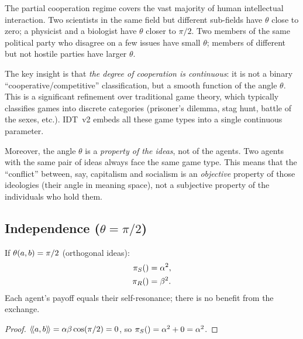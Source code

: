 \begin{interpretation}
\label{interp:cooperation-spectrum}
The partial cooperation regime covers the vast majority of human intellectual
interaction. Two scientists in the same field but different sub-fields have
$\theta$ close to zero; a physicist and a biologist have $\theta$ closer to
$\pi/2$. Two members of the same political party who disagree on a few issues
have small $\theta$; members of different but not hostile parties have larger
$\theta$.

The key insight is that \emph{the degree of cooperation is continuous}: it is
not a binary ``cooperative/competitive'' classification, but a smooth function
of the angle $\theta$. This is a significant refinement over traditional game
theory, which typically classifies games into discrete categories (prisoner's
dilemma, stag hunt, battle of the sexes, etc.). IDT~v2 embeds all these game
types into a single continuous parameter.

Moreover, the angle $\theta$ is a \emph{property of the ideas}, not of the
agents. Two agents with the same pair of ideas always face the same game type.
This means that the ``conflict'' between, say, capitalism and socialism is an
\emph{objective} property of those ideologies (their angle in meaning space),
not a subjective property of the individuals who hold them.
\end{interpretation}


\subsection{Independence ($\theta = \pi/2$)}

\begin{proposition}
\label{prop:independence}
If $\theta(a,b) = \pi/2$ (orthogonal ideas):
\begin{align*}
  \pi_{S}() &= \alpha^2, \\
  \pi_{R}() &= \beta^2.
\end{align*}
Each agent's payoff equals their self-resonance; there is no benefit from the
exchange.
\end{proposition}

\begin{proof}
$\langle\!\langle a, b \rangle\!\rangle = \alpha\beta\cos(\pi/2) = 0$, so $\pi_{S}() = \alpha^2 + 0 =
\alpha^2$.
\end{proof}

